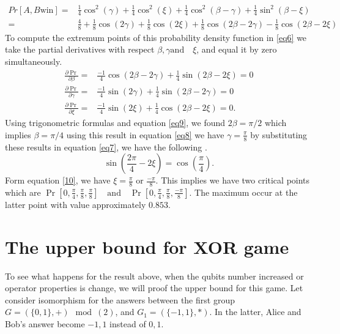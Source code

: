 \begin{align}
Pr[A,B \text{win}]=& \frac{1}{4} \cos^2(\gamma)+\frac{1}{4} \cos^2(\xi)+\frac{1}{4} \cos^2(\beta-\gamma)+\frac{1}{4} \sin^2(\beta-\xi)\label{finpr}\\ 
=&\frac{4}{8} +\frac{1}{8}  \cos(2 \gamma)+\frac{1}{8}  \cos(2 \xi)+\frac{1}{8}  \cos(2\beta-2\gamma)-\frac{1}{8} \cos(2\beta-2\xi)\label{eq6}
\end{align}
To compute the extremum points of this probability density function in \ref{eq6} we take the partial derivatives with respect $\beta ,\gamma  \text{and} \quad \xi$,  and equal it by zero simultaneously.
\begin{align}
\frac{\partial \Pr}{\partial \beta}=& \frac{-1}{4}\cos(2\beta-2\gamma)+ \frac{1}{4}\sin(2\beta-2\xi)=0\label{eq7} \\
\frac{\partial\Pr}{\partial \gamma}=& \frac{-1}{4}\sin(2\gamma)+ \frac{1}{4}\sin(2\beta-2\gamma)=0\label{eq8}\\
\frac{\partial \Pr}{\partial \xi}=& \frac{-1}{4}\sin(2\xi)+ \frac{1}{4}\cos(2\beta-2\xi)=0\label{eq9}.
\end{align}
Using trigonometric formulas and  equation \ref{eq9}, we found $2\beta=\pi/2$ which implies $\beta=\pi/4$
using this result in equation \ref{eq8} we have $ \gamma=\frac{\pi}{8}$ by substituting these results in equation \ref{eq7}, we have the following .
\begin{equation}
\sin(\frac{2\pi}{4}-2\xi)=\cos(\frac{\pi}{4})\label{10}.
\end{equation}
Form   equation  \ref{10}, we have $\xi=\frac{\pi}{8}$ or $\frac{-\pi}{8}$. This implies we have two critical points which are $\Pr[0,\frac{\pi}{4},\frac{\pi}{8} ,\frac{\pi}{8}] \quad \text{and}\quad \Pr[0,\frac{\pi}{4},\frac{\pi}{8} ,\frac{-\pi}{8}]$. The  maximum occur at the  latter  point with value approximately $0.853$.



\section{The upper bound for XOR game}\hfill \break
To see what happens for the result above, when the qubits number increased or operator properties is change, we will proof the upper bound for this game. Let consider isomorphism for the answers between  the first group $G=(\{0,1\},+) \mod(2)$, and $ G_1=(\{-1,1\},*)$. In the latter, Alice and Bob's answer become ${-1,1}$ instead of $0,1$. 


